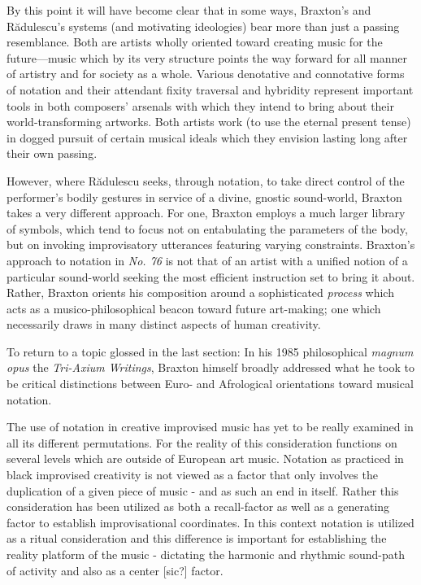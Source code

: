     By this point it will have become clear that in some ways, Braxton's and R\u{a}dulescu's systems (and motivating ideologies) bear more than just a passing resemblance. Both are artists wholly oriented toward creating music for the future---music which by its very structure points the way forward for all manner of artistry and for society as a whole. Various denotative and connotative forms of notation and their attendant fixity traversal and hybridity represent important tools in both composers' arsenals with which they intend to bring about their world-transforming artworks. Both artists work (to use the eternal present tense) in dogged pursuit of certain musical ideals which they envision lasting long after their own passing.

    However, where R\u{a}dulescu seeks, through notation, to take direct control of the performer's bodily gestures in service of a divine, gnostic sound-world, Braxton takes a very different approach. For one, Braxton employs a much larger library of symbols, which tend to focus not on entabulating the parameters of the body, but on invoking improvisatory utterances featuring varying constraints. Braxton's approach to notation in \textit{No. 76} is not that of an artist with a unified notion of a particular sound-world seeking the most efficient instruction set to bring it about. Rather, Braxton orients his composition around a sophisticated \textit{process} which acts as a musico-philosophical beacon toward future art-making; one which necessarily draws in many distinct aspects of human creativity.
    
    To return to a topic glossed in the last section: In his 1985 philosophical \textit{magnum opus} the \textit{Tri-Axium Writings}, Braxton himself broadly addressed what he took to be critical distinctions between Euro- and Afrological orientations toward musical notation.
    
    \begin{smallquote}
        The use of notation in creative improvised music has yet to be really examined in all its different permutations. For the reality of this consideration functions on several levels which are outside of European art music. Notation as practiced in black improvised creativity is not viewed as a factor that only involves the duplication of a given piece of music - and as such an end in itself. Rather this consideration has been utilized as both a recall-factor as well as a generating factor to establish improvisational coordinates. In this context notation is utilized as a ritual consideration and this difference is important for establishing the reality platform of the music - dictating the harmonic and rhythmic sound-path of activity and also as a center [sic?] factor.\autocite[35]{Braxton_1985}
    \end{smallquote}

